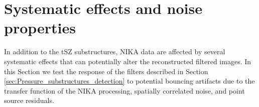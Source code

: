\documentclass[traditabstract]{aa}
\begin{document}
\section{Systematic effects and noise properties}\label{sec:Systematics_and_noise_properties}
In addition to the tSZ substructures, NIKA data are affected by several systematic effects that can potentially alter the reconstructed filtered images. In this Section we test the response of the filters described in Section \ref{sec:Pressure_substructures_detection} to potential bouncing artifacts due to the transfer function of the NIKA processing, spatially correlated noise, and point source residuals.
\end{document}
